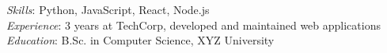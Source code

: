 \documentclass[10pt]{report}
\begin{document}
\lhead[\nopage]{}

{\large \emph{Skills}: Python, JavaScript, React, Node.js \\
\emph{Experience}: 3 years at TechCorp, developed and maintained web applications \\
\emph{Education}: B.Sc. in Computer Science, XYZ University}
\end{document}
